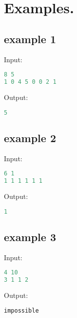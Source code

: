 \documentclass[10pt]{article}
\begin{document}
\section{Examples.}
\subsection{example 1}
Input:
\begin{lstlisting}[language=Python]
8 5
1 0 4 5 0 0 2 1
\end{lstlisting}
Output:
\begin{lstlisting}[language=Python]
5
\end{lstlisting}
\subsection{example 2}
Input:
\begin{lstlisting}[language=Python]
6 1
1 1 1 1 1 1
\end{lstlisting}
Output:
\begin{lstlisting}[language=Python]
1
\end{lstlisting}
\subsection{example 3}
Input:
\begin{lstlisting}[language=Python]
4 10
3 1 1 2
\end{lstlisting}
Output:
\begin{lstlisting}[language=Python]
impossible
\end{lstlisting}
\end{document}

